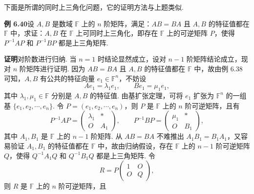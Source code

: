 \documentclass[UTF8, 12pt, fontset=fandol, oneside]{ctexart}
\begin{document}
下面是所谓的同时上三角化问题，它的证明方法与上题类似.

\noindent\textbf{例 6.40}\quad 设 $A,B$ 是数域 $\mathbb{F}$ 上的 $n$ 阶矩阵，满足：$AB=BA$ 且 $A,B$ 的特征值都在 $\mathbb{F}$ 中，求证：$A,B$ 在 $\mathbb{F}$ 上可同时上三角化，即存在 $\mathbb{F}$ 上的可逆矩阵 $P$，使得 $P^{-1}AP$ 和 $P^{-1}BP$ 都是上三角矩阵.

\noindent\textbf{证明}\quad 对阶数进行归纳. 当 $n=1$ 时结论显然成立，设对 $n-1$ 阶矩阵结论成立，现对 $n$ 阶矩阵进行证明. 因为 $AB=BA$ 且 $A,B$ 的特征值都在 $\mathbb{F}$ 中，故由例 6.38 可知，$A,B$ 有公共的特征向量 $e_1\in\mathbb{F}^n$，不妨设
\[
Ae_1=\lambda_1e_1,\qquad Be_1=\mu_1e_1,
\]
其中 $\lambda_1,\mu_1\in\mathbb{F}$ 分别是 $A,B$ 的特征值. 由基扩张定理，可将 $e_1$ 扩张为 $\mathbb{F}^n$ 的一组基 $\{e_1,e_2,\cdots,e_n\}$. 令 $P=(e_1,e_2,\cdots,e_n)$，则 $P$ 是 $\mathbb{F}$ 上的 $n$ 阶可逆矩阵，且有
\[
P^{-1}AP=\left(\begin{array}{cc}
\lambda_1 & *\\
O & A_1
\end{array}\right),\qquad
P^{-1}BP=\left(\begin{array}{cc}
\mu_1 & *\\
O & B_1
\end{array}\right),
\]
其中 $A_1,B_1$ 是 $\mathbb{F}$ 上的 $n-1$ 阶矩阵. 从 $AB=BA$ 不难推出 $A_1B_1=B_1A_1$，又容易验证 $A_1,B_1$ 的特征值都在 $\mathbb{F}$ 中，故由归纳假设，存在 $\mathbb{F}$ 上的 $n-1$ 阶可逆矩阵 $Q$，使得 $Q^{-1}A_1Q$ 和 $Q^{-1}B_1Q$ 都是上三角矩阵. 令
\[
R=P\left(\begin{array}{cc}
1 & O\\
O & Q
\end{array}\right),
\]
则 $R$ 是 $\mathbb{F}$ 上的 $n$ 阶可逆矩阵，且
\end{document}
